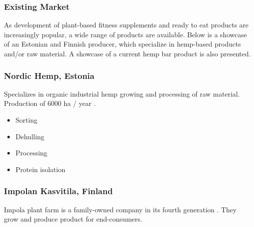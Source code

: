 \subsubsection{Existing Market}
As development of plant-based fitness supplements and ready to eat products are increasingly popular, a wide range of products are available. Below is a showcase of an Estonian and Finnish producer, which specialize in hemp-based products and/or raw material. A showcase of a current hemp bar product is also presented.

\subsubsection*{Nordic Hemp, Estonia}
Specializes in organic industrial hemp growing and processing of raw material. Production of 6000 ha / year \cite*{NordicHempSite}.
\begin{itemize}
    \item Sorting
    \item Dehulling
    \item Processing
    \item Protein isolation
\end{itemize}

\subsubsection*{Impolan Kasvitila, Finland}
Impola plant farm is a family-owned company in its fourth generation \cite*{ImpolanKasvitilaFrontPage}.
They grow and produce product for end-consumers. 

